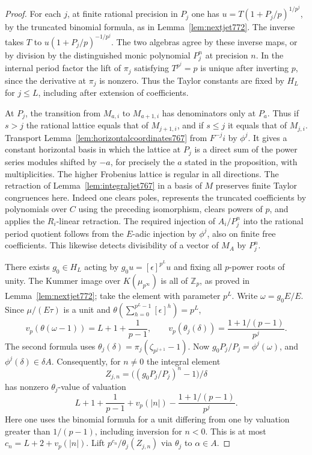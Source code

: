 \documentclass[a4paper,11pt]{article}
\theoremstyle{definition}
\theoremstyle{remark}
\newcommand{\ZZ}{\mathbb Z}\newcommand{\ord}{\operatorname{ord}}
\numberwithin{equation}{section}
\begin{document}
\begin{proof}
For each \(j\), at finite rational precision in \(P_j\)
one has \(u=T(1+P_j/p)^{1/p^j}\), by the truncated
binomial formula, as in Lemma~\ref{lem:nextjet772}.
The inverse takes \(T\) to \(u(1+P_j/p)^{-1/p^j}\).
The two algebras agree by these inverse maps, or by
division by the distinguished monic polynomial \(P_j^n\)
at precision \(n\). In the internal period factor the
lift of \(\pi_j\) satisfying \(T^{p^j}=p\) is unique
after inverting \(p\), since the derivative at \(\pi_j\)
is nonzero. Thus the Taylor constants are fixed by \(H_L\)
for \(j\le L\), including after extension of coefficients.

At \(P_j\), the transition from \(M_{a,i}\) to \(M_{a+1,i}\)
has denominators only at \(P_a\). Thus if \(s>j\) the
rational lattice equals that of \(M_{j+1,i}\), and if
\(s\le j\) it equals that of \(M_{j,i}\). Transport
Lemma~\ref{lem:horizontalcoordinates767} from \(F^{-j}i\)
by \(\phi^j\). It gives a constant horizontal basis in
which the lattice at \(P_j\) is a direct sum of the
power series modules shifted by \(-a\), for precisely
the \(a\) stated in the proposition, with multiplicities.
The higher Frobenius lattice is regular in all directions.
The retraction of Lemma~\ref{lem:integraljet767} in a
basis of \(M\) preserves finite Taylor congruences here.
Indeed one clears poles, represents the truncated
coefficients by polynomials over \(C\) using the
preceding isomorphism, clears powers of \(p\), and applies
the \(R_i\)-linear retraction. The required injection
of \(A_i/P_j^n\) into the rational period quotient follows
from the \(E\)-adic injection by \(\phi^j\), also on
finite free coefficients. This likewise detects
divisibility of a vector of \(M_A\) by \(P_j^n\).

There exists \(g_0\in H_L\) acting by
\(g_0u=[\epsilon]^{p^L}u\) and fixing all \(p\)-power
roots of unity. The Kummer image over
\(K(\mu_{p^\infty})\) is all of \(\ZZ_p\), as proved
in Lemma~\ref{lem:nextjet772}; take the element with
parameter \(p^L\). Write \(\omega=g_0E/E\).
Since \(\mu/(E\tau)\) is a unit and
\(\theta(\sum_{h=0}^{p^L-1}[\epsilon]^h)=p^L\),
\[
 v_p(\theta(\omega-1))=L+1+\frac1{p-1},\qquad
 v_p(\theta_j(\delta))=\frac{1+1/(p-1)}{p^j}.
\]
The second formula uses
\(\theta_j(\delta)=\pi_j(\zeta_{p^{j+1}}-1)\).
Now \(g_0P_j/P_j=\phi^j(\omega)\), and
\(\phi^j(\delta)\in\delta A\).
Consequently, for \(n\ne0\) the integral element
\[
        Z_{j,n}=\big((g_0P_j/P_j)^n-1\big)/\delta
\]
has nonzero \(\theta_j\)-value of valuation
\[
 L+1+\frac{1}{p-1}+v_p(|n|)
                         -\frac{1+1/(p-1)}{p^j}.
\]
Here one uses the binomial formula for a unit differing
from one by valuation greater than \(1/(p-1)\), including
inversion for \(n<0\).
This is at most \(c_n=L+2+v_p(|n|)\).
Lift \(p^{c_n}/\theta_j(Z_{j,n})\) via \(\theta_j\) to
\(\alpha\in A\).


\end{proof}
\end{document}
